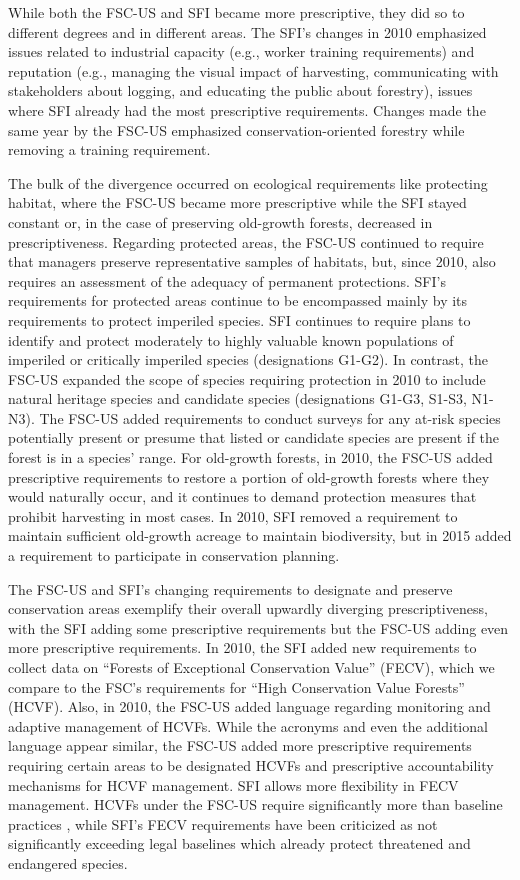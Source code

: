 \documentclass[
      12pt,
            Review ]{article}
\begin{document}


While both the FSC-US and SFI became more prescriptive, they did so to
different degrees and in different areas. The SFI's changes in 2010
emphasized issues related to industrial capacity (e.g., worker training
requirements) and reputation (e.g., managing the visual impact of
harvesting, communicating with stakeholders about logging, and educating
the public about forestry), issues where SFI already had the most
prescriptive requirements. Changes made the same year by the FSC-US
emphasized conservation-oriented forestry while removing a training
requirement.

The bulk of the divergence occurred on ecological requirements like
protecting habitat, where the FSC-US became more prescriptive while the
SFI stayed constant or, in the case of preserving old-growth forests,
decreased in prescriptiveness. Regarding protected areas, the FSC-US
continued to require that managers preserve representative samples of
habitats, but, since 2010, also requires an assessment of the adequacy
of permanent protections. SFI's requirements for protected areas
continue to be encompassed mainly by its requirements to protect
imperiled species. SFI continues to require plans to identify and
protect moderately to highly valuable known populations of imperiled or
critically imperiled species (designations G1-G2). In contrast, the
FSC-US expanded the scope of species requiring protection in 2010 to
include natural heritage species and candidate species (designations
G1-G3, S1-S3, N1-N3). The FSC-US added requirements to conduct surveys
for any at-risk species potentially present or presume that listed or
candidate species are present if the forest is in a species' range. For
old-growth forests, in 2010, the FSC-US added prescriptive requirements
to restore a portion of old-growth forests where they would naturally
occur, and it continues to demand protection measures that prohibit
harvesting in most cases. In 2010, SFI removed a requirement to maintain
sufficient old-growth acreage to maintain biodiversity, but in 2015
added a requirement to participate in conservation planning.

The FSC-US and SFI's changing requirements to designate and preserve
conservation areas exemplify their overall upwardly diverging
prescriptiveness, with the SFI adding some prescriptive requirements but
the FSC-US adding even more prescriptive requirements. In 2010, the SFI
added new requirements to collect data on ``Forests of Exceptional
Conservation Value'' (FECV), which we compare to the FSC's requirements
for ``High Conservation Value Forests'' (HCVF). Also, in 2010, the
FSC-US added language regarding monitoring and adaptive management of
HCVFs. While the acronyms and even the additional language appear
similar, the FSC-US added more prescriptive requirements requiring
certain areas to be designated HCVFs and prescriptive accountability
mechanisms for HCVF management. SFI allows more flexibility in FECV
management. HCVFs under the FSC-US require significantly more than
baseline practices \citep{Newsom2005}, while SFI's FECV requirements
have been criticized as not significantly exceeding legal baselines
which already protect threatened and endangered species.
\end{document}
